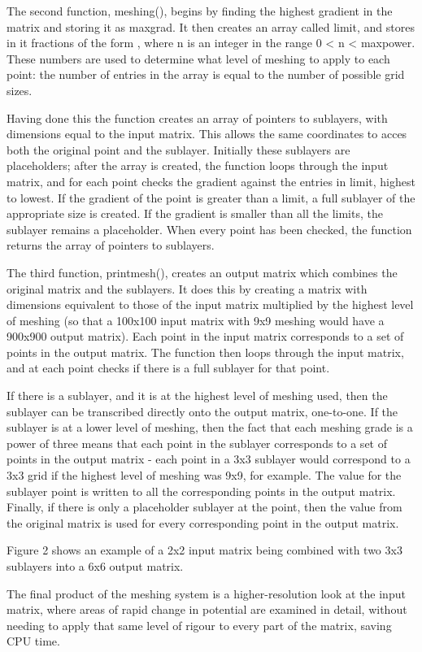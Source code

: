 The second function, meshing(), begins by finding the highest gradient in the matrix and storing it as maxgrad. It then creates an array called limit, and stores in it fractions of the form , where n is an integer in the range 0 < n < maxpower. These numbers are used to determine what level of meshing to apply to each point: the number of entries in the array is equal to the number of possible grid sizes.

Having done this the function creates an array of pointers to sublayers, with dimensions equal to the input matrix. This allows the same coordinates to acces both the original point and the sublayer. Initially these sublayers are placeholders; after the array is created, the function loops through the input matrix, and for each point checks the gradient against the entries in limit, highest to lowest. If the gradient of the point is greater than a limit, a full sublayer of the appropriate size is created. If the gradient is smaller than all the limits, the sublayer remains a placeholder. When every point has been checked, the function returns the array of pointers to sublayers.

The third function, printmesh(), creates an output matrix which combines the original matrix and the sublayers. It does this by creating a matrix with dimensions equivalent to those of the input matrix multiplied by the highest level of meshing (so that a 100x100 input matrix with 9x9 meshing would have a 900x900 output matrix). Each point in the input matrix corresponds to a set of points in the output matrix. The function then loops through the input matrix, and at each point checks if there is a full sublayer for that point.

If there is a sublayer, and it is at the highest level of meshing used, then the sublayer can be transcribed directly onto the output matrix, one-to-one. If the sublayer is at a lower level of meshing, then the fact that each meshing grade is a power of three means that each point in the sublayer corresponds to a set of points in the output matrix - each point in a 3x3 sublayer would correspond to a 3x3 grid if the highest level of meshing was 9x9, for example. The value for the sublayer point is written to all the corresponding points in the output matrix. Finally, if there is only a placeholder sublayer at the point, then the value from the original matrix is used for every corresponding point in the output matrix.

Figure 2 shows an example of a 2x2 input matrix being combined with two 3x3 sublayers into a 6x6 output matrix.

The final product of the meshing system is a higher-resolution look at the input matrix, where areas of rapid change in potential are examined in detail, without needing to apply that same level of rigour to every part of the matrix, saving CPU time.
